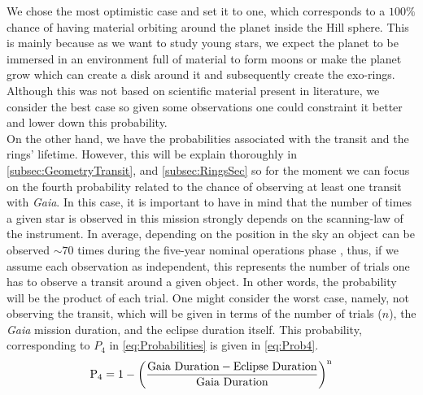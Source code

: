 We chose the most optimistic case and set it to one, which corresponds to a $100\%$ chance of having material orbiting around the planet inside the Hill sphere. This is mainly because as we want to study young stars, we expect the planet to be immersed in an environment full of material to form moons or make the planet grow which can create a disk around it and subsequently create the exo-rings. Although this was not based on scientific material present in literature, we consider the best case so given some observations one could constraint it better and lower down this probability.\\

On the other hand, we have the probabilities associated with the transit and the rings' lifetime. However, this will be explain thoroughly in \autoref{subsec:GeometryTransit}, and  \autoref{subsec:RingsSec} so for the moment we can focus on the fourth probability related to the chance of observing at least one transit with \textit{Gaia}. In this case, it is important to have in mind that the number of times a given star is observed in this mission strongly depends on the scanning-law of the instrument. In average, depending on the position in the sky an object can be observed $\sim70$ times during the five-year nominal operations phase \citeyear{2016A&A...595A...1G}, thus, if we assume each observation as independent, this represents the number of trials one has to observe a transit around a given object. In other words, the probability will be the product of each trial. One might consider the worst case, namely, not observing the transit, which will be given in terms of the number of trials ($n$), the \textit{Gaia} mission duration, and the eclipse duration itself. This probability, corresponding to $P_4$ in \autoref{eq:Probabilities} is given in \autoref{eq:Prob4}.\\

\begingroup
\Large
\begin{equation}
\textnormal{P}_4 = 1 - \left( \frac{\textnormal{Gaia}~\textnormal{Duration} - \textnormal{Eclipse}~\textnormal{Duration}}{\textnormal{Gaia}~\textnormal{Duration}} \right)^\textnormal{n}
 \label{eq:Prob4}
\end{equation}
\endgroup\\

